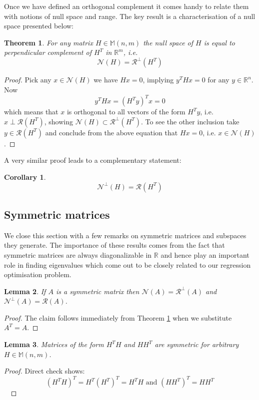 \documentclass[a4paper]{article}
\theoremstyle{break}
\newtheorem{theorem}{Theorem}[section]
\newtheorem{corollary}{Corollary}[theorem]
\newtheorem{lemma}[theorem]{Lemma}
\newcommand{\R}{\mathbb{R}}
\newcommand{\Nu}{\mathcal{N}}
\newcommand{\Ra}{\mathcal{R}}
\newcommand{\Mat}[2]{\mathbb{M}(#1, #2)}
\begin{document}
Once we have defined an orthogonal complement it comes handy to relate them with notions of null space and range.
The key result is a characterisation of a null space presented below:

\begin{theorem} \label{thm:charact_nullspace}
    For any matrix $H \in \Mat{n}{m}$ the null space of $H$ is equal to perpendicular complement of $H^T$ in $\R^m$, i.e.
    $$\Nu(H) = \Ra^\perp(H^T)$$
\end{theorem}

\begin{proof}
    Pick any $x \in \Nu(H)$ we have $H x = 0$, implying $ y^T H x = 0$ for any $y \in \R^n$. Now
    $$  y^T H x = (H^T y )^T x = 0$$
    which means that $x$ is orthogonal to all vectors of the form $ H^T y $, i.e. $ x \perp \Ra(H^T)$, showing $ \Nu(H) \subset \Ra^\perp(H^T)$. To see the other inclusion take $ y \in \Ra(H^T) $ and conclude from the above equation that $ H x = 0$, i.e. $ x \in \Nu(H)$.
\end{proof}
A very similar proof leads to a complementary statement:
\begin{corollary} \label{cor:charact_range}
    $$\Nu^\perp(H) = \Ra(H^T)$$
\end{corollary}

\subsection{Symmetric matrices}
We close this section with a few remarks on symmetric matrices and subspaces they generate. The importance of these results comes from the fact that symmetric matrices are always diagonalizable in $\R$ and hence play an important role in finding eigenvalues which come out to be closely related to our regression optimisation problem. 

\begin{lemma} \label{lem:charact_sym_nullspace}
    If $A$ is a symmetric matrix then $\Nu(A) = \Ra^\perp(A)$ and $\Nu^\perp(A) = \Ra(A)$.
\end{lemma}
\begin{proof}
    The claim follows immediately from Theorem \ref{thm:charact_nullspace} when we substitute $A^T = A$.
\end{proof}

\begin{lemma}
Matrices of the form $H^T H$ and $H H^T$ are symmetric for arbitrary $H \in \Mat{n}{m}$.
\end{lemma}
\begin{proof}
    Direct check shows:
    $$(H^T H)^T = H^T (H^T)^T = H^T H \text{ and } (H H^T)^T = H H^T$$~
\end{proof}
\end{document}
